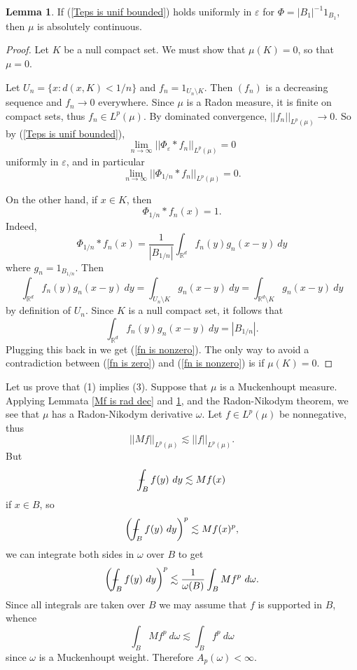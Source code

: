 \documentclass[12pt]{book}
\newcommand{\RR}{\mathbb{R}}
\def\Xint#1{\mathchoice
{\XXint\displaystyle\textstyle{#1}}%
{\XXint\textstyle\scriptstyle{#1}}%
{\XXint\scriptstyle\scriptscriptstyle{#1}}%
{\XXint\scriptscriptstyle\scriptscriptstyle{#1}}%
\!\int}
\def\XXint#1#2#3{{\setbox0=\hbox{$#1{#2#3}{\int}$ }
\vcenter{\hbox{$#2#3$ }}\kern-.6\wd0}}
\def\dashint{\Xint-}
\theoremstyle{definition}
\newtheorem{lemma}[theorem]{Lemma}
\begin{document}
\begin{lemma}
\label{muckenhoupt is abs cts}
If (\ref{Teps is unif bounded}) holds uniformly in $\varepsilon$ for $\Phi = |B_1|^{-1} 1_{B_1}$, then $\mu$ is absolutely continuous.
\end{lemma}
\begin{proof}
Let $K$ be a null compact set. We must show that $\mu(K) = 0$, so that $\mu = 0$.

Let $U_n = \{x: d(x, K) < 1/n\}$ and $f_n = 1_{U_n \setminus K}$. Then $(f_n)$ is a decreasing sequence and $f_n \to 0$ everywhere.
Since $\mu$ is a Radon measure, it is finite on compact sets, thus $f_n \in L^p(\mu)$. By dominated convergence, $||f_n||_{L^p(\mu)} \to 0$.
So by (\ref{Teps is unif bounded}),
$$\lim_{n \to \infty}||\Phi_\varepsilon * f_n||_{L^p(\mu)} = 0$$ uniformly in $\varepsilon$, and in particular
\begin{equation}
\label{fn is zero}
\lim_{n \to \infty} ||\Phi_{1/n} * f_n||_{L^p(\mu)} = 0.
\end{equation}

On the other hand, if $x \in K$, then
\begin{equation}
\label{fn is nonzero}
\Phi_{1/n} * f_n(x) = 1.
\end{equation}
Indeed,
$$\Phi_{1/n} * f_n(x) = \frac{1}{|B_{1/n}|} \int_{\RR^d} f_n(y) g_n(x - y) ~dy$$
where $g_n = 1_{B_{1/n}}$. Then
$$\int_{\RR^d} f_n(y) g_n(x - y) ~dy = \int_{U_n \setminus K} g_n(x - y) ~dy = \int_{\RR^d \setminus K} g_n(x - y) ~dy$$
by definition of $U_n$. Since $K$ is a null compact set, it follows that
$$\int_{\RR^d} f_n(y) g_n(x - y) ~dy = |B_{1/n}|.$$
Plugging this back in we get (\ref{fn is nonzero}).
The only way to avoid a contradiction between (\ref{fn is zero}) and (\ref{fn is nonzero}) is if $\mu(K) = 0$.
\end{proof}

Let us prove that (1) implies (3). Suppose that $\mu$ is a Muckenhoupt measure. Applying Lemmata \ref{Mf is rad dec} and \ref{muckenhoupt is abs cts}, and the Radon-Nikodym theorem, we see that $\mu$ has a Radon-Nikodym derivative $\omega$.
Let $f \in L^p(\mu)$ be nonnegative, thus
$$||Mf||_{L^p(\mu)} \lesssim ||f||_{L^p(\mu)}.$$
But
$$\dashint_B f(y) ~dy \lesssim Mf(x)$$
if $x \in B$, so
$$\left(\dashint_B f(y) ~dy\right)^p \lesssim Mf(x)^p,$$
we can integrate both sides in $\omega$ over $B$ to get
$$\left(\dashint_B f(y) ~dy\right)^p \lesssim \frac{1}{\omega(B)} \int_B Mf^p ~d\omega.$$
Since all integrals are taken over $B$ we may assume that $f$ is supported in $B$, whence
$$\int_B Mf^p ~d\omega \lesssim \int_B f^p ~d\omega$$
since $\omega$ is a Muckenhoupt weight. Therefore $A_p(\omega) < \infty$.
\end{document}
